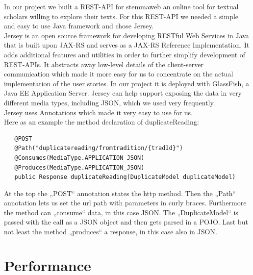 \documentclass[11pt,fleqn,openany]{book} %
\begin{document}
In our project we built a REST-API for stemmaweb an online tool for textual scholars willing to explore their texts. For this REST-API we needed a simple and easy to use Java framework and chose Jersey. \\
Jersey is an open source framework for developing RESTful Web Services in Java that is built upon JAX-RS and serves as a JAX-RS Reference Implementation. It adds additional features and utilities in order to further simplify development of REST-APIs. It abstracts away low-level details of the client-server communication which made it more easy for us to concentrate on the actual implementation of the user stories. In our project it is deployed with GlassFish, a Java EE Application Server. Jersey can help support exposing the data in very different media types, including JSON, which we used very frequently. \\
Jersey uses Annotations which made it very easy to use for us.\\
Here as an example the method declaration of duplicateReading:
\begin{lstlisting}
   @POST
   @Path("duplicatereading/fromtradition/{tradId}")
   @Consumes(MediaType.APPLICATION_JSON)
   @Produces(MediaType.APPLICATION_JSON)
   public Response duplicateReading(DuplicateModel duplicateModel)
\end{lstlisting}
At the top the „POST“ annotation states the http method. Then the „Path“ annotation lets us set the url path with parameters in curly braces. Furthermore the method can „consume“ data, in this case JSON. The „DuplicateModel“ is passed with the call as a JSON object and then gets parsed in a POJO. Last but not least the method „produces“ a response, in this case also in JSON. 




\chapter{Performance}
\end{document}
